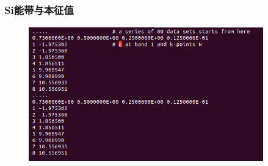 \frame
{
	\frametitle{\textrm{Si}能带与本征值}
	{\fontsize{7.2pt}{5.2pt}}%
\begin{figure}[h!]
	\vskip -3pt
\centering
\includegraphics[width=4.0in,viewport=0 0 640 375,clip]{Figures/Si_Band-EIGENVAL.png}
\caption{\fontsize{6.2pt}{5.2pt}}%
\label{Si_Band-EIGENVAL}
\end{figure}

}

